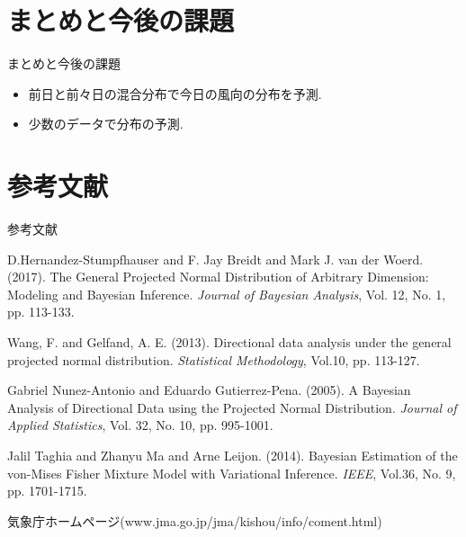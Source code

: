 \documentclass[dvipdfmx]{beamer}
\begin{document}
\section{まとめと今後の課題}
\begin{frame}{まとめと今後の課題}

\begin{itemize}

\item
前日と前々日の混合分布で今日の風向の分布を予測.

\item
少数のデータで分布の予測.

\end{itemize}

\end{frame}

\section{参考文献}
\begin{frame}[allowframebreaks]{参考文献}

{\scriptsize
\begin{thebibliography}{99}
\beamertemplatetextbibitems %

D.Hernandez-Stumpfhauser and F. Jay Breidt and Mark J. van der Woerd. (2017). The General Projected Normal Distribution of Arbitrary Dimension: Modeling and Bayesian Inference. {\it Journal of Bayesian Analysis}, Vol. 12, No. 1, pp. 113-133.

Wang, F. and Gelfand, A. E. (2013). Directional data analysis under the general
projected normal distribution. {\it Statistical Methodology}, Vol.10, pp. 113-127.

Gabriel Nunez-Antonio and Eduardo Gutierrez-Pena. (2005). A Bayesian Analysis of Directional Data using the Projected Normal Distribution. {\it Journal of Applied Statistics}, Vol. 32, No. 10, pp. 995-1001.

Jalil Taghia and Zhanyu Ma and Arne Leijon. (2014). Bayesian Estimation of the von-Mises Fisher Mixture Model with Variational Inference. {\it IEEE}, Vol.36, No. 9, pp. 1701-1715.

気象庁ホームページ(www.jma.go.jp/jma/kishou/info/coment.html) 

\end{thebibliography}
}

\end{frame}
\end{document}
